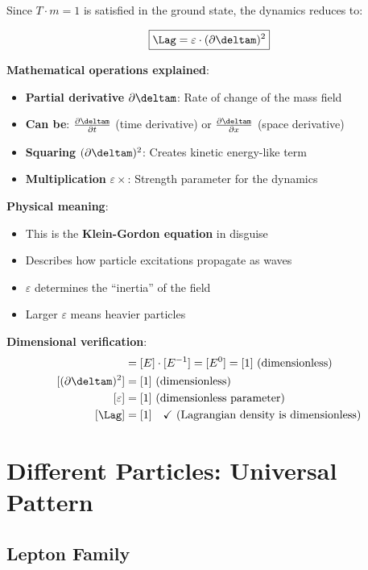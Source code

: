 	Since $T \cdot m = 1$ is satisfied in the ground state, the dynamics reduces to:
	
	\begin{equation}
		\boxed{\Lag = \varepsilon \cdot (\partial \deltam)^2}
		\label{eq:particle_lagrangian}
	\end{equation}
	
	\textbf{Mathematical operations explained}:
	\begin{itemize}
		\item \textbf{Partial derivative} $\partial \deltam$: Rate of change of the mass field
		\item \textbf{Can be}: $\frac{\partial \deltam}{\partial t}$ (time derivative) or $\frac{\partial \deltam}{\partial x}$ (space derivative)
		\item \textbf{Squaring} $(\partial \deltam)^2$: Creates kinetic energy-like term
		\item \textbf{Multiplication} $\varepsilon \times$: Strength parameter for the dynamics
	\end{itemize}
	
	\textbf{Physical meaning}:
	\begin{itemize}
		\item This is the \textbf{Klein-Gordon equation} in disguise
		\item Describes how particle excitations propagate as waves
		\item $\varepsilon$ determines the ``inertia'' of the field
		\item Larger $\varepsilon$ means heavier particles
	\end{itemize}
	
	\textbf{Dimensional verification}:
	\begin{align}
		[\partial \deltam] &= [E] \cdot [E^{-1}] = [E^0] = [1] \text{ (dimensionless)} \\
		[(\partial \deltam)^2] &= [1] \text{ (dimensionless)} \\
		[\varepsilon] &= [1] \text{ (dimensionless parameter)} \\
		[\Lag] &= [1] \quad \checkmark \text{ (Lagrangian density is dimensionless)}
	\end{align}
	
	\section{Different Particles: Universal Pattern}
	
	\subsection{Lepton Family}
	
